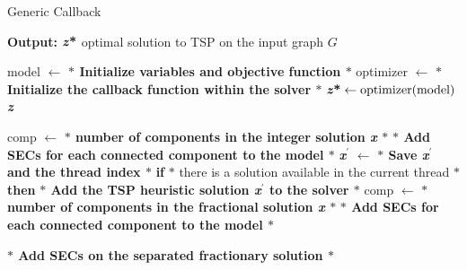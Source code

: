 \begin{algorithm}
    \caption{Generic Callback}\label{Generic Callback}
    \hspace*{\algorithmicindent} \textbf{Output:} $\textbf{\textit{z}\text{*}} $ optimal solution to TSP on the input graph $G$
    \begin{algorithmic}[1]
  \State model $ \leftarrow $ \textbf{$\ast$ Initialize variables and objective function $\ast$ }
  \State optimizer $ \leftarrow $ \textbf{$\ast$ Initialize the callback function within the solver $\ast$ }
  \State $\textbf{\textit{z}\text{*}} \gets \text{optimizer(model)}$
  \State \Return \textbf{\textit{z}\text{*}}
\EndFunction
\\
 
   	\State comp $ \leftarrow $ \textbf{$\ast$ number of components in the integer solution \textit{x} $\ast$ }
	\State \textbf{$\ast$ Add SECs for each connected component to the model $\ast$ }
	\State \textbf{\textit{x}$^{\prime}$} $ \leftarrow $ 
	\State \textbf{$\ast$ Save \textbf{\textit{x}$^{\prime}$} and the thread index $\ast$ }
	\EndIf  
	\State \textbf{if} $\ast$ there is a solution available in the current thread $\ast$ \textbf{then}
	\State \textbf{$\ast$ Add the TSP heuristic solution \textbf{\textit{x}$^{\prime}$} to the solver $\ast$ }
	\EndIf  
   	\State comp $ \leftarrow $ \textbf{$\ast$ number of components in the fractional solution \textit{x} $\ast$ }
	\State \textbf{$\ast$ Add SECs for each connected component to the model $\ast$ }
	\EndIf
    	\end{algorithmic}
	\label{alg:genlazycall}
   	\end{algorithm}
	\vspace{1cm}
	\begin{algorithm}                   
   	 \begin{algorithmic} [1]              
	\State \textbf{$\ast$ Add SECs on the separated fractionary solution $\ast$ }
	\EndIf 
	\EndIf  
	\State \Return 
	\EndFunction

    \end{algorithmic}
    \end{algorithm}

